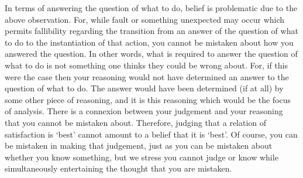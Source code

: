 \documentclass[10pt]{article}
\begin{document}
In terms of answering the question of what to do, belief is problematic due to the above observation.
For, while fault or something unexpected may occur which permits fallibility regarding the transition from an answer of the question of what to do to the instantiation of that action, you cannot be mistaken about how you answered the question.
In other words, what is required to answer the question of what to do is not something one thinks they could be wrong about.
For, if this were the case then your reasoning would not have determined an answer to the question of what to do.
The answer would have been determined (if at all) by some other piece of reasoning, and it is this reasoning which would be the focus of analysis.
There is a connexion between your judgement and your reasoning that you cannot be mistaken about.
Therefore, judging that a relation of satisfaction is `best' cannot amount to a belief that it is `best'.
Of course, you can be mistaken in making that judgement, just as you can be mistaken about whether you know something, but we stress you cannot judge or know while simultaneously entertaining the thought that you are mistaken.
\end{document}
